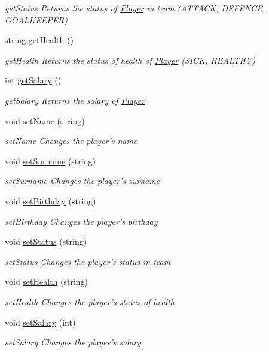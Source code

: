 \begin{DoxyCompactItemize}
\begin{DoxyCompactList}\small\item\em get\-Status Returns the status of \hyperlink{class_player}{Player} in team (A\-T\-T\-A\-C\-K, D\-E\-F\-E\-N\-C\-E, G\-O\-A\-L\-K\-E\-E\-P\-E\-R) \end{DoxyCompactList}\item 
string \hyperlink{class_player_a279a88a14ea16ec00142ca5340d36ae5}{get\-Health} ()
\begin{DoxyCompactList}\small\item\em get\-Health Returns the status of health of \hyperlink{class_player}{Player} (S\-I\-C\-K, H\-E\-A\-L\-T\-H\-Y) \end{DoxyCompactList}\item 
int \hyperlink{class_player_a4da3eb8caa9d3bf29ab0e7107247ad35}{get\-Salary} ()
\begin{DoxyCompactList}\small\item\em get\-Salary Returns the salary of \hyperlink{class_player}{Player} \end{DoxyCompactList}\item 
void \hyperlink{class_player_a8eaf43a2f2236b21d0101270ecca1483}{set\-Name} (string)
\begin{DoxyCompactList}\small\item\em set\-Name Changes the player's name \end{DoxyCompactList}\item 
void \hyperlink{class_player_a11039442924e73772e1e6e8e92b974a5}{set\-Surname} (string)
\begin{DoxyCompactList}\small\item\em set\-Surname Changes the player's surname \end{DoxyCompactList}\item 
void \hyperlink{class_player_ac7136dd8416f8c52a5ea7ce7b9d3b30b}{set\-Birthday} (string)
\begin{DoxyCompactList}\small\item\em set\-Birthday Changes the player's birthday \end{DoxyCompactList}\item 
void \hyperlink{class_player_a08cf2edf8cfd3bbeefd1befb397e6920}{set\-Status} (string)
\begin{DoxyCompactList}\small\item\em set\-Status Changes the player's status in team \end{DoxyCompactList}\item 
void \hyperlink{class_player_af052e51778a8d555094613b6d9fffa5a}{set\-Health} (string)
\begin{DoxyCompactList}\small\item\em set\-Health Changes the player's status of health \end{DoxyCompactList}\item 
void \hyperlink{class_player_a2f48d324e01aada508e7d0c55918bd64}{set\-Salary} (int)
\begin{DoxyCompactList}\small\item\em set\-Salary Changes the player's salary \end{DoxyCompactList}\end{DoxyCompactItemize}

